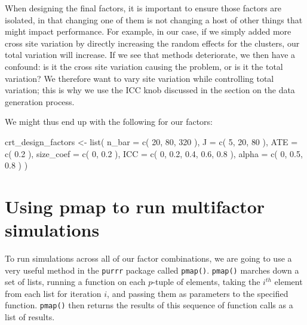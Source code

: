 \documentclass[
]{book}
\newenvironment{Shaded}{\begin{snugshade}}{\end{snugshade}}
\newcommand{\AttributeTok}[1]{\textcolor[rgb]{0.77,0.63,0.00}{#1}}
\newcommand{\DecValTok}[1]{\textcolor[rgb]{0.00,0.00,0.81}{#1}}
\newcommand{\FloatTok}[1]{\textcolor[rgb]{0.00,0.00,0.81}{#1}}
\newcommand{\FunctionTok}[1]{\textcolor[rgb]{0.00,0.00,0.00}{#1}}
\newcommand{\NormalTok}[1]{#1}
\newcommand{\OtherTok}[1]{\textcolor[rgb]{0.56,0.35,0.01}{#1}}
\begin{document}
When designing the final factors, it is important to ensure those factors are isolated, in that changing one of them is not changing a host of other things that might impact performance.
For example, in our case, if we simply added more cross site variation by directly increasing the random effects for the clusters, our total variation will increase.
If we see that methods deteriorate, we then have a confound: is it the cross site variation causing the problem, or is it the total variation?
We therefore want to vary site variation while controlling total variation; this is why we use the ICC knob discussed in the section on the data generation process.

We might thus end up with the following for our factors:

\begin{Shaded}
\begin{Highlighting}[]
\NormalTok{crt\_design\_factors }\OtherTok{\textless{}{-}} \FunctionTok{list}\NormalTok{(}
  \AttributeTok{n\_bar =} \FunctionTok{c}\NormalTok{( }\DecValTok{20}\NormalTok{, }\DecValTok{80}\NormalTok{, }\DecValTok{320}\NormalTok{ ),}
  \AttributeTok{J =} \FunctionTok{c}\NormalTok{( }\DecValTok{5}\NormalTok{, }\DecValTok{20}\NormalTok{, }\DecValTok{80}\NormalTok{ ),}
  \AttributeTok{ATE =} \FunctionTok{c}\NormalTok{( }\FloatTok{0.2}\NormalTok{ ),}
  \AttributeTok{size\_coef =} \FunctionTok{c}\NormalTok{( }\DecValTok{0}\NormalTok{, }\FloatTok{0.2}\NormalTok{ ),}
  \AttributeTok{ICC =} \FunctionTok{c}\NormalTok{( }\DecValTok{0}\NormalTok{, }\FloatTok{0.2}\NormalTok{, }\FloatTok{0.4}\NormalTok{, }\FloatTok{0.6}\NormalTok{, }\FloatTok{0.8}\NormalTok{ ),}
  \AttributeTok{alpha =} \FunctionTok{c}\NormalTok{( }\DecValTok{0}\NormalTok{, }\FloatTok{0.5}\NormalTok{, }\FloatTok{0.8}\NormalTok{ )}
\NormalTok{)}
\end{Highlighting}
\end{Shaded}

\hypertarget{using-pmap-to-run-multifactor-simulations}{%
\section{Using pmap to run multifactor simulations}\label{using-pmap-to-run-multifactor-simulations}}

To run simulations across all of our factor combinations, we are going to use a very useful method in the \texttt{purrr} package called \texttt{pmap()}.
\texttt{pmap()} marches down a set of lists, running a function on each \(p\)-tuple of elements, taking the \(i^{th}\) element from each list for iteration \(i\), and passing them as parameters to the specified function.
\texttt{pmap()} then returns the results of this sequence of function calls as a list of results.
\end{document}
